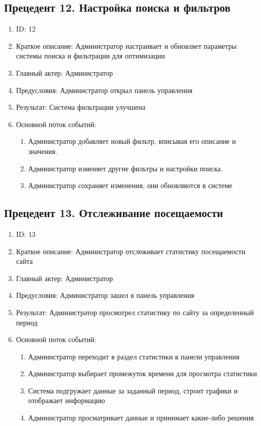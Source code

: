 \documentclass{article}
\begin{document}
\subsection{Прецедент 12. Настройка поиска и фильтров}
\begin{enumerate}
    \item ID: 12
    \item Краткое описание: Администратор настраивает и обновляет параметры системы поиска и фильтрации для оптимизации
    \item Главный актер: Администратор
    \item Предусловия: Администратор открыл панель управления
    \item Результат: Система фильтрации улучшена
    \item Основной поток событий:
    \begin{enumerate}
        \item Администратор добавляет новый фильтр, вписывая его описание и значения. 
        \item Администратор изменяет другие фильтры и настройки поиска.
        \item Администратор сохраняет изменения, они обновляются в системе
    \end{enumerate}
\end{enumerate}

\subsection{Прецедент 13. Отслеживание посещаемости}
\begin{enumerate}
    \item ID: 13
    \item Краткое описание: Администратор отслеживает статистику посещаемости сайта
    \item Главный актер: Администратор
    \item Предусловия: Администратор зашел в панель управления
    \item Результат: Администратор просмотрел статистику по сайту за определенный период
    \item Основной поток событий:
    \begin{enumerate}
        \item Администратор переходит в раздел статистики в панели управления
        \item Администратор выбирает промежуток времени для просмотра статистики
        \item Система подгружает данные за заданный период, строит графики и отображает информацию
        \item Администратор просматривает данные и принимает какие-либо решения
    \end{enumerate}
\end{enumerate}
\end{document}
